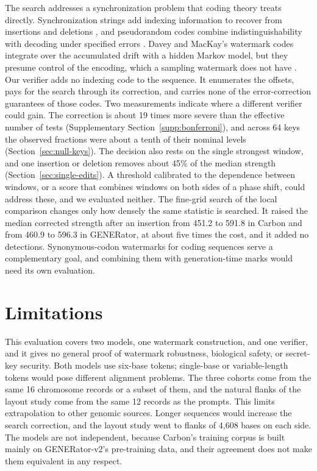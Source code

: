 \documentclass[10pt,twocolumn]{article}
\begin{document}
The search addresses a synchronization problem that coding theory treats directly.
Synchronization strings add indexing information to recover from insertions and deletions
\cite{haeupler2017synchronization}, and pseudorandom codes combine indistinguishability with
decoding under specified errors \cite{christ2024prc}. Davey and MacKay's watermark codes integrate
over the accumulated drift with a hidden Markov model, but they presume control of the encoding,
which a sampling watermark does not have \cite{davey2001reliable}. Our verifier adds no indexing
code to the sequence. It enumerates the offsets, pays for the search through its correction, and
carries none of the error-correction guarantees of those codes. Two measurements indicate where a
different verifier could gain. The correction is about 19 times more severe than the effective
number of tests (Supplementary Section~\ref{supp:bonferroni}), and across 64 keys the observed
fractions were about a tenth of their nominal levels (Section~\ref{sec:null-keys}). The decision also
rests on the single strongest window, and one insertion or deletion removes about 45\% of the median
strength (Section~\ref{sec:single-edits}). A threshold calibrated to the dependence between windows,
or a score that combines windows on both sides of a phase shift, could address these, and we
evaluated neither. The fine-grid search of the local comparison changes only how densely the same
statistic is searched. It raised the median corrected strength after an insertion from 451.2 to 591.8
in Carbon and from 460.9 to 596.3 in GENERator, at about five times the cost, and it added no
detections. Synonymous-codon watermarks for
coding sequences \cite{zhang2025securing} serve a complementary goal, and combining them with
generation-time marks would need its own evaluation.

\section{Limitations}
\label{sec:limitations}

This evaluation covers two models, one watermark construction, and one verifier, and it gives no
general proof of watermark robustness, biological safety, or secret-key security. Both models use
six-base tokens; single-base or variable-length tokens would pose different alignment problems.
The three cohorts come from the same 16 chromosome records or a subset of them, and the natural
flanks of the layout study come from the same 12 records as the prompts. This limits extrapolation to
other genomic sources. Longer sequences would increase the search correction, and the layout study
went to flanks of 4{,}608 bases on each side. The
models are not independent, because Carbon's training corpus is built mainly on GENERator-v2's
pre-training data, and their agreement does not make them equivalent in any respect.
\end{document}
